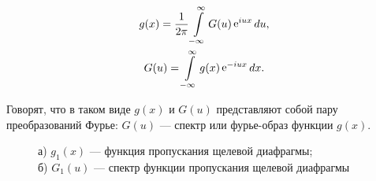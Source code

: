 \documentclass[a5paper,10pt, twoside]{article} %
\begin{document}
	\begin{equation}
		\begin{gathered} 
			g(x) = \frac{1}{2\pi} \int\limits_{-\infty}^{\infty} G(u) \mathop{\mathrm e}\nolimits^{iux} du,\\
			G(u) = \int\limits_{-\infty}^{\infty} g(x) \mathop{\mathrm e}\nolimits^{-iux} dx.
		 \end{gathered}
	\end{equation}
	
	Говорят, что в таком виде $g(x)$ и $G(u)$ представляют собой пару преобразований Фурье: 
	$G(u)$ — спектр или фурье-образ функции $g(x)$.
	
	\begin{figure}[h]\label{ris:dia}
		\begin{minipage}[h]{0.4\linewidth}
		\end{minipage}
		\hfill
		\begin{minipage}[h]{0.6\linewidth}
		\end{minipage}
		\caption
		{
			а) $g_1 (x)$ — функция пропускания щелевой диафрагмы; \\
			б) $G_1 (u)$ — спектр функции пропускания щелевой диафрагмы
		}
	\end{figure}
	
\end{document}
